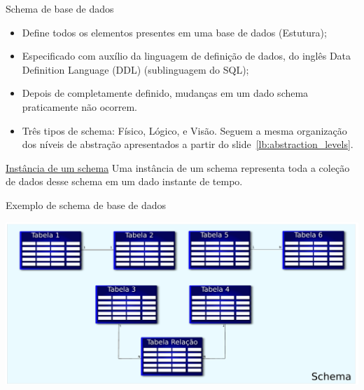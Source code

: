 \documentclass[xcolor=x11names,compress]{beamer}
\begin{document}
\begin{frame}[allowframebreaks]{Schema de base de dados}

\begin{itemize}
\itemsep 5mm

\item Define todos os elementos presentes em uma base de dados (Estutura);

\item Especificado com auxílio da linguagem de definição de dados, do inglês Data Definition Language (DDL) (sublinguagem do SQL);

\item Depois de completamente definido, mudanças em um dado schema praticamente não ocorrem.

\item Três tipos de schema: Físico, Lógico, e Visão. Seguem a mesma organização dos níveis de abstração apresentados a partir do slide~\ref{lb:abstraction_levels}.  

\end{itemize}

\begin{alertblock}{\centering \underline{Instância de um schema}}
\centering Uma instância de um schema  representa toda a coleção de dados desse schema em um dado instante de tempo.
\end{alertblock}

\end{frame}

\begin{frame}{Exemplo de schema de base de dados}

\begin{center}
\includegraphics[keepaspectratio,width=\textwidth]{schema}
\end{center}

\end{frame}
\end{document}
